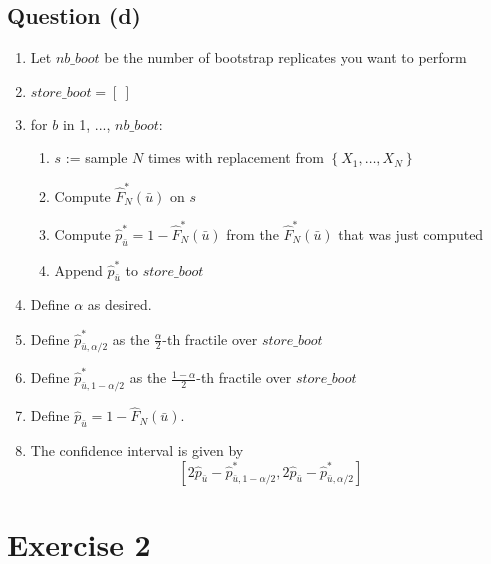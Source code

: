 \documentclass[12pt]{article}
\begin{document}
\subsection{Question (d)}
\begin{enumerate}
    \item Let \(nb\_boot\) be the number of bootstrap replicates you want to perform
    \item \(store\_boot = [\ ]\)
    \item for \(b\) in 1, ..., \(nb\_boot\):
          \begin{enumerate}
              \item \(s\) := sample \(N\) times with replacement from \(\left\{X_1, \ldots, X_N\right\}\)
              \item Compute \(\hat{F}_N^* (\bar u)\) on \(s\)
              \item Compute \(\hat{p}_{\bar{u}}^* = 1 - \hat{F}_N^* (\bar u)\) from the \(\hat{F}_N^* (\bar u)\) that was just computed
              \item Append \(\hat{p}_{\bar{u}}^*\) to \(store\_boot\)
          \end{enumerate}
    \item Define \(\alpha\) as desired.
    \item Define \(\hat{p}_{\bar{u}, \alpha/2}^*\) as the \(\frac{\alpha}{2}\)-th fractile over \(store\_boot\)
    \item Define \(\hat{p}_{\bar{u}, 1-\alpha/2}^*\) as the \(\frac{1-\alpha}{2}\)-th fractile over \(store\_boot\)
    \item Define \(\hat{p}_{\bar{u}} = 1 - \hat{F}_N (\bar u)\).
    \item The confidence interval is given by
          \[
              \left[ 2 \hat{p}_{\bar{u}} - \hat{p}_{\bar{u}, 1-\alpha/2}^* , 2 \hat{p}_{\bar{u}} - \hat{p}_{\bar{u}, \alpha/2}^* \right]
          \]
\end{enumerate}


\section{Exercise 2}
\end{document}

